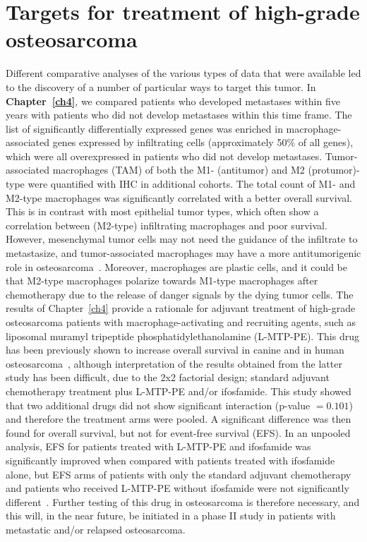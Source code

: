 \section{Targets for treatment of high-grade osteosarcoma}\label{targets9}
Different comparative analyses of the various types of data that were available led to the discovery of a number of particular ways to target this tumor. In {\bf Chapter~\ref{ch4}}, we compared patients who developed metastases within five years with patients who did not develop metastases within this time frame. The list of significantly differentially expressed genes was enriched in macrophage\hyp{}associated genes expressed by infiltrating cells (approximately 50\% of all genes), which were all overexpressed in patients who did not develop metastases. Tumor\hyp{}associated macrophages (TAM) of both the M1- (antitumor) and M2 (protumor)\hyp{}type were quantified with IHC in additional cohorts. The total count of M1- and M2-type macrophages was significantly correlated with a better overall survival. This is in contrast with most epithelial tumor types, which often show a correlation between (M2-type) infiltrating macrophages and poor survival. However, mesenchymal tumor cells may not need the guidance of the infiltrate to metastasize, and tumor\hyp{}associated macrophages may have a more antitumorigenic role in osteosarcoma~\cite{cleton2012immunotherapy}. Moreover, macrophages are plastic cells, and it could be that M2-type macrophages polarize towards M1-type macrophages after chemotherapy due to the release of danger signals by the dying tumor cells. The results of Chapter~\ref{ch4} provide a rationale for adjuvant treatment of high\hyp{}grade osteosarcoma patients with macrophage\hyp{}activating and recruiting agents, such as liposomal muramyl tripeptide phosphatidylethanolamine (L-MTP-PE). This drug has been previously shown to increase overall survival in canine and in human osteosarcoma~\cite{cleton2012immunotherapy,kager2010review}, although interpretation of the results obtained from the latter study has been difficult, due to the 2x2 factorial design; standard adjuvant chemotherapy treatment plus L-MTP-PE and/or ifosfamide. This study showed that two additional drugs did not show significant interaction (p-value $=0.101$) and therefore the treatment arms were pooled. A significant difference was then found for overall survival, but not for event\hyp{}free survival (EFS). In an unpooled analysis, EFS for patients treated with L-MTP-PE and ifosfamide was significantly improved when compared with patients treated with ifosfamide alone, but EFS arms of patients with only the standard adjuvant chemotherapy and patients who received L-MTP-PE without ifosfamide were not significantly different~\cite{kager2010review}. Further testing of this drug in osteosarcoma is therefore necessary, and this will, in the near future, be initiated in a phase II study in patients with metastatic and/or relapsed osteosarcoma.

